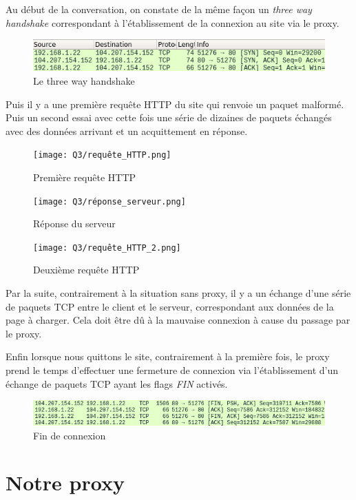 \documentclass[12 pt,a4paper,frenchb]{article}
\begin{document}
Au début de la conversation, on constate de la même façon un \textit{three way handshake} correspondant à l'établissement de la connexion au site via le proxy.

\begin{figure}[h]
  \centering
  \includegraphics[scale=0.8]{Q3/three_way_handshake.png}
  \caption{Le three way handshake}
\end{figure}
\vspace{1cm}

Puis il y a une première requête HTTP du site qui renvoie un paquet malformé. Puis un second essai avec cette fois une série de dizaines de paquets échangés avec des données arrivant et un acquittement en réponse.

\begin{figure}[h]
  \centering
  \texttt{[image: Q3/requête\_HTTP.png]}
  \caption{Première requête HTTP}
  \vspace{1cm}
  \texttt{[image: Q3/réponse\_serveur.png]}
  \caption{Réponse du serveur}
  \vspace{1cm}
  \texttt{[image: Q3/requête\_HTTP\_2.png]}
  \caption{Deuxième requête HTTP}
\end{figure}
\vspace{1cm}

Par la suite, contrairement à la situation sans proxy, il y a un échange d'une série de paquets TCP entre le client et le serveur, correspondant aux données de la page à charger. Cela doit être dû à la mauvaise connexion à cause du passage par le proxy.

Enfin lorsque nous quittons le site, contrairement à la première fois, le proxy prend le temps d'effectuer une fermeture de connexion via l'établissement d'un échange de paquets TCP ayant les flags \textit{FIN} activés.

\begin{figure}[h]
  \centering
  \includegraphics{Q3/fin_de_connexion.png}
  \caption{Fin de connexion}
\end{figure}
\vspace{1cm}

\section{Notre proxy}
\end{document}
